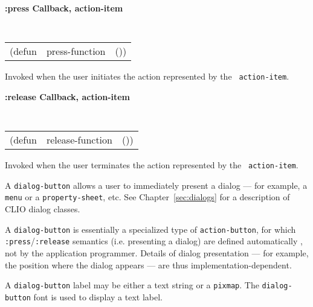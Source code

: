
{\samepage
{\large {\bf :press \hfill Callback, action-item}} 
\begin{flushright} 
\parbox[t]{6.125in}{
\tt
\begin{tabular}{lll}
\raggedright
(defun & press-function & ())
\end{tabular}
\rm

}\end{flushright}}

\begin{flushright} \parbox[t]{6.125in}{
Invoked when the user initiates the action represented by the {\tt
action-item}.

}\end{flushright}

 
{\samepage
{\large {\bf :release \hfill Callback, action-item}} 
\begin{flushright} 
\parbox[t]{6.125in}{
\tt
\begin{tabular}{lll}
\raggedright
(defun & release-function & ())
\end{tabular}
\rm

}\end{flushright}}

\begin{flushright} \parbox[t]{6.125in}{
Invoked when the user terminates the action represented by the {\tt
action-item}.


}\end{flushright}


\vfill\pagebreak



A {\tt dialog-button} allows a user to immediately present a dialog --- for
example, a {\tt menu} or a {\tt property-sheet}, etc.  See
Chapter~\ref{sec:dialogs} for a description of CLIO dialog classes.

A {\tt dialog-button} is essentially a specialized type of {\tt action-button},
for which {\tt :press}/{\tt :release} semantics (i.e.  presenting a dialog) are
defined automatically , not by the application programmer.  Details of dialog
presentation --- for example, the position where the dialog appears --- are thus
implementation-dependent.

A {\tt dialog-button} label may be either a text string or a {\tt pixmap}.
The {\tt dialog-button} font is used to display a text label.

